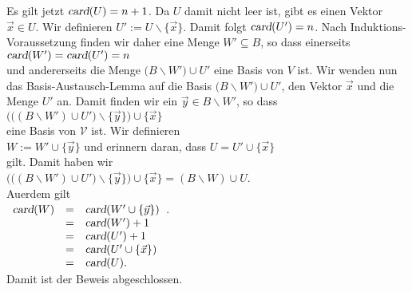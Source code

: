 \begin{enumerate}
             Es gilt jetzt $\textsl{card}(U) = n + 1$. Da $U$ damit nicht leer ist, gibt es einen Vektor $\vec{x} \in U$. Wir definieren 
             $U' := U \backslash \{ \vec{x} \}$.  Damit folgt $\textsl{card}(U') = n$.  Nach Induktions-Voraussetzung
             finden wir daher eine Menge $W' \subseteq B$, so dass einerseits
             \\[0.2cm]
             \hspace*{1.3cm}
             $\textsl{card}(W')= \textsl{card}(U') = n$ 
             \\[0.2cm]
             und andererseits die Menge $\bigl(B \backslash W'\bigr) \cup U'$  eine Basis von $V$ ist.  Wir wenden nun das Basis-Austausch-Lemma
             auf die Basis $\bigl(B \backslash W'\bigr) \cup U'$, den Vektor $\vec{x}$ und die Menge $U'$ an.  Damit finden wir 
             ein $\vec{y} \in B \backslash W'$, so dass
             \\[0.2cm]
             \hspace*{1.3cm}
             $\bigl(\bigl((B \backslash W') \cup U'\bigr)  \backslash \{ \vec{y} \}\bigr) \cup \{ \vec{x} \}$
             \\[0.2cm]
             eine Basis von $\mathcal{V}$ ist.  Wir definieren 
             \\[0.2cm]
             \hspace*{1.3cm}
             $W := W' \cup \{ \vec{y} \}$ \quad und erinnern daran, dass \quad
             $U = U' \cup \{ \vec{x} \}$ 
             \\[0.2cm]
             gilt.  Damit haben wir 
             \\[0.2cm]
             \hspace*{1.3cm}
             $\bigl(\bigl((B \backslash W') \cup U'\bigr)  \backslash \{ \vec{y} \}\bigr) \cup \{ \vec{x} \} = (B \backslash W) \cup U$.
             \\[0.2cm]
             Au\3erdem gilt
             \\[0.2cm]
             \hspace*{1.3cm}
             $
             \begin{array}[t]{lcl}
               \textsl{card}(W) & = & \textsl{card}(W' \cup \{\vec{y}\}) \\
                                & = & \textsl{card}(W') + 1        \\
                                & = & \textsl{card}(U') + 1        \\
                                & = & \textsl{card}(U' \cup \{ \vec{x} \}) \\
                                & = & \textsl{card}(U).
             \end{array}
             $.
             \\[0.2cm]
             Damit ist der Beweis abgeschlossen.  \qeds
\end{enumerate}

